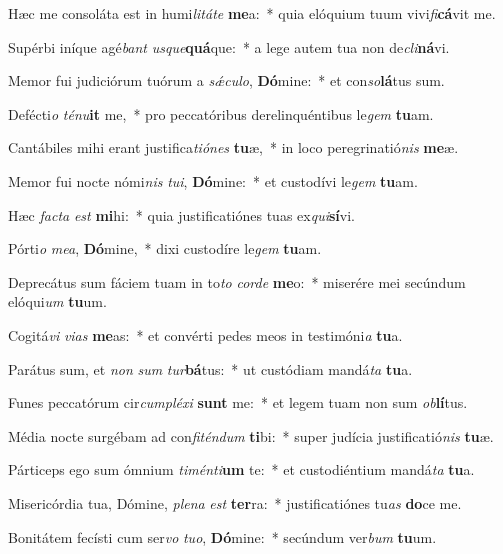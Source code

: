 \item Hæc me consoláta est in humi\textit{li}\textit{tá}\textit{te} \textbf{me}a:~* quia elóquium tuum vivi\textit{fi}\textbf{cá}vit me.
\item Supérbi iníque agé\textit{bant} \textit{us}\textit{que}\textbf{quá}que:~* a lege autem tua non de\textit{cli}\textbf{ná}vi.
\item Memor fui judiciórum tuórum a \textit{sǽ}\textit{cu}\textit{lo}, \textbf{Dó}mine:~* et con\textit{so}\textbf{lá}tus sum.
\item Defécti\textit{o} \textit{té}\textit{nu}\textbf{it} me,~* pro peccatóribus derelinquéntibus le\textit{gem} \textbf{tu}am.
\item Cantábiles mihi erant justifica\textit{ti}\textit{ó}\textit{nes} \textbf{tu}æ,~* in loco peregrinatió\textit{nis} \textbf{me}æ.
\item Memor fui nocte nómi\textit{nis} \textit{tu}\textit{i}, \textbf{Dó}mine:~* et custodívi le\textit{gem} \textbf{tu}am.
\item Hæc \textit{fac}\textit{ta} \textit{est} \textbf{mi}hi:~* quia justificatiónes tuas ex\textit{qui}\textbf{sí}vi.
\item Pórti\textit{o} \textit{me}\textit{a}, \textbf{Dó}mine,~* dixi custodíre le\textit{gem} \textbf{tu}am.
\item Deprecátus sum fáciem tuam in to\textit{to} \textit{cor}\textit{de} \textbf{me}o:~* miserére mei secúndum elóqui\textit{um} \textbf{tu}um.
\item Cogitá\textit{vi} \textit{vi}\textit{as} \textbf{me}as:~* et convérti pedes meos in testimóni\textit{a} \textbf{tu}a.
\item Parátus sum, et \textit{non} \textit{sum} \textit{tur}\textbf{bá}tus:~* ut custódiam mandá\textit{ta} \textbf{tu}a.
\item Funes peccatórum cir\textit{cum}\textit{plé}\textit{xi} \textbf{sunt} me:~* et legem tuam non sum \textit{ob}\textbf{lí}tus.
\item Média nocte surgébam ad con\textit{fi}\textit{tén}\textit{dum} \textbf{ti}bi:~* super judícia justificatió\textit{nis} \textbf{tu}æ.
\item Párticeps ego sum ómnium \textit{ti}\textit{mén}\textit{ti}\textbf{um} te:~* et custodiéntium mandá\textit{ta} \textbf{tu}a.
\item Misericórdia tua, Dómine, \textit{ple}\textit{na} \textit{est} \textbf{ter}ra:~* justificatiónes tu\textit{as} \textbf{do}ce me.
\item Bonitátem fecísti cum ser\textit{vo} \textit{tu}\textit{o}, \textbf{Dó}mine:~* secúndum ver\textit{bum} \textbf{tu}um.
